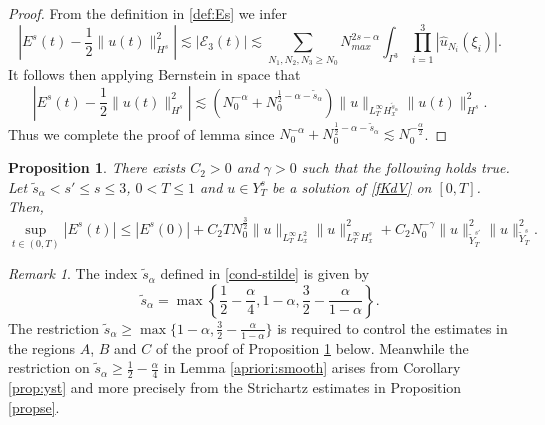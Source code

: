 \documentclass{amsart}
\newtheorem{proposition}[theorem]{Proposition}
\theoremstyle{definition}
\theoremstyle{remark}
\newtheorem{remark}[theorem]{Remark}
\numberwithin{equation}{section}
\begin{document}
\begin{proof}
From the definition in \eqref{def:Es} we infer
$$
\left| E^s(t) - \frac 12\|u(t)\|_{H^s}^2\right|\lesssim |\mathcal{E}_3(t)| \lesssim \sum_{N_1,N_2,N_3 \ge N_0} N_{max}^{2s-\alpha} \int_{\Gamma^3} \prod_{i=1}^3 \left| \widehat{u}_{N_i}(\xi_i) \right|.
$$
It follows then applying Bernstein in space that
$$
\left| E^s(t) - \frac 12\|u(t)\|_{H^s}^2\right| \lesssim (N_0^{-\alpha} + N_0^{\frac 12-\alpha-\widetilde{s}_\alpha} ) \|u\|_{L^\infty_TH^{\widetilde{s}_\alpha}_x} \|u(t)\|_{H^s}^2.
$$
Thus we complete the proof of lemma since $N_0^{-\alpha} + N_0^{\frac 12-\alpha-\widetilde{s}_\alpha} \lesssim N_0^{-\frac{\alpha}2}$.
\end{proof}
\begin{proposition}\label{prop:Es}
  There exists $C_2>0$ and $\gamma>0$ such that the following holds true. Let $\widetilde{s}_\alpha<s'\le s \le 3$, $0<T\le 1$ and $u\in Y^s_T$ be a solution of \eqref{fKdV} on $[0,T]$. Then,  \begin{equation}\label{est:Es}
    \sup_{t\in (0,T)} |E^s(t)| \le |E^s(0)| + C_2TN_0^{\frac 32}\|u\|_{L^\infty_TL^2_x}\|u\|_{L^\infty_TH^s_x}^2 + C_2N_0^{-\gamma} \|u\|_{\widetilde{Y}^{s'}_T}^2\|u\|_{\widetilde{Y}^s_T}^2 .
  \end{equation}
\end{proposition}

\begin{remark}
The index $\widetilde{s}_{\alpha}$ defined in \eqref{cond-stilde} is given by
\[ \widetilde{s}_\alpha = \max\left\{\frac12-\frac{\alpha}4,1-\alpha, \frac32-\frac{\alpha}{1-\alpha}\right\} . \]
The restriction  $\widetilde{s}_\alpha \ge \max\big\{1-\alpha, \frac32-\frac{\alpha}{1-\alpha}\big\}$  is required to control the estimates in the regions $A$, $B$ and $C$ of the proof of Proposition \ref{prop:Es} below.  Meanwhile the restriction on $\widetilde{s}_\alpha \ge \frac12-\frac{\alpha}4$ in Lemma \ref{apriori:smooth} arises from  Corollary \ref{prop:yst} and more precisely from the Strichartz estimates in Proposition \ref{propse}.
\end{remark}
\end{document}
